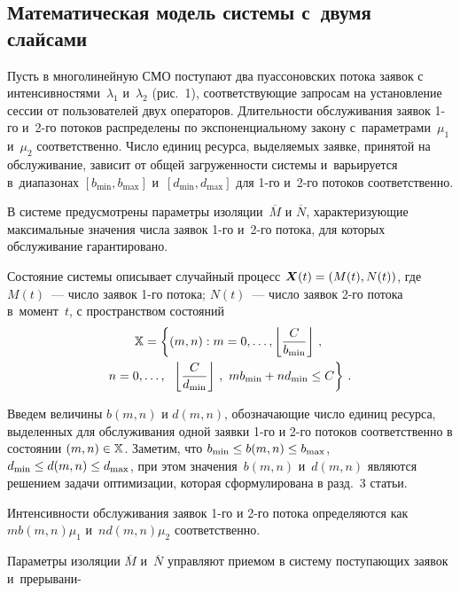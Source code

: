 \begin{multicols}{2}
  \section{Математическая модель системы с~двумя слайсами} %
  
  Пусть в многолинейную СМО поступают два пуассоновских потока 
заявок с интенсивностями~$\lambda_1$ и~$\lambda_2$ (рис.~1), 
соответствующие запросам на установление сессии от пользователей двух 
операторов. Длительности обслуживания заявок 1-го и~2-го потоков 
распределены по экспоненциальному закону с~параметрами~$\mu_1$ 
и~$\mu_2$ соответственно. Чис\-ло единиц ресурса, выделяемых заявке, 
принятой на обслуживание, зависит от общей за\-гру\-жен\-ности сис\-те\-мы 
и~варьируется в~диапазонах $[b_{\min}, b_{\max}]$ и~$[d_{\min}, d_{\max}]$ 
для 1-го и~2-го потоков со\-от\-вет\-ст\-венно.
  
  В системе предусмотрены параметры изоляции~$\overline{M}$ и 
$\overline{N}$, характеризующие максимальные значения числа заявок 1-го 
и~2-го потока, для которых обслуживание гарантировано.

  Состояние системы описывает случайный процесс 
$\boldsymbol{X}(t)\hm= \left(M(t), N(t)\right)$, где $M(t)$~--- число заявок 1-го потока; 
$N(t)$~--- число заявок 2-го потока в~момент~$t$, с пространством 
состояний
\begin{multline*}
  \mathbb{X}=\left\{ (m,n): m=0,\ldots , \left\lfloor \fr{C}{b_{\min}}\right\rfloor\,,\right.\\ 
n=0,\ldots ,\enskip
\left. \left\lfloor \fr{C}{d_{\min}}\right\rfloor \,,\ mb_{\min}+nd_{\min}\leq 
C\right\}\,.
  \end{multline*}
  
  Введем величины $b(m,n)$ и $d(m,n)$, обо\-зна\-ча\-ющие число единиц 
ресурса, выделенных для обслуживания одной заявки 1-го и 2-го потоков 
соответственно в состоянии $(m,n)\hm\in\mathbb{X}$. Заметим, что 
$b_{\min}\hm\leq b(m,n)\hm\leq b_{\max}$, $d_{\min}\hm\leq d(m,n)\hm\leq 
d_{\max}$, при этом значения~$b(m,n)$ и~$d(m,n)$ являются решением 
задачи оптимизации, которая сформулирована в разд.~3 статьи. 
  
  Интенсивности обслуживания заявок 1-го и 2-го потока определяются как 
$mb(m,n)\mu_1$ и~$nd(m,n)\mu_2$ соответственно.
  

  Параметры изоляции $\overline{M}$ и~$\overline{N}$ управляют при\-емом 
в систему поступающих заявок и~прерывани-\linebreak
\vspace*{-12pt}


\end{multicols}
